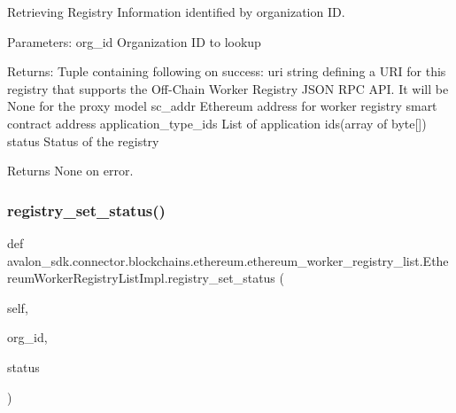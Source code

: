 \begin{DoxyVerb}Retrieving Registry Information identified by organization ID.

Parameters:
org_id     Organization ID to lookup

Returns:
Tuple containing following on success:
uri                  string defining a URI for this registry that
             supports the Off-Chain Worker Registry JSON
             RPC API. It will be None for the proxy model
sc_addr              Ethereum address for worker registry
             smart contract address
application_type_ids List of application ids(array of byte[])
status               Status of the registry

Returns None on error.
\end{DoxyVerb}
 \mbox{\label{classavalon__sdk_1_1connector_1_1blockchains_1_1ethereum_1_1ethereum__worker__registry__list_1_1EthereumWorkerRegistryListImpl_ada2447abc644cc0eb8e774ddeb12fcec}} 
\subsubsection{\texorpdfstring{registry\+\_\+set\+\_\+status()}{registry\_set\_status()}}
{\footnotesize\ttfamily def avalon\+\_\+sdk.\+connector.\+blockchains.\+ethereum.\+ethereum\+\_\+worker\+\_\+registry\+\_\+list.\+Ethereum\+Worker\+Registry\+List\+Impl.\+registry\+\_\+set\+\_\+status (\begin{DoxyParamCaption}\item[{}]{self,  }\item[{}]{org\+\_\+id,  }\item[{}]{status }\end{DoxyParamCaption})}

